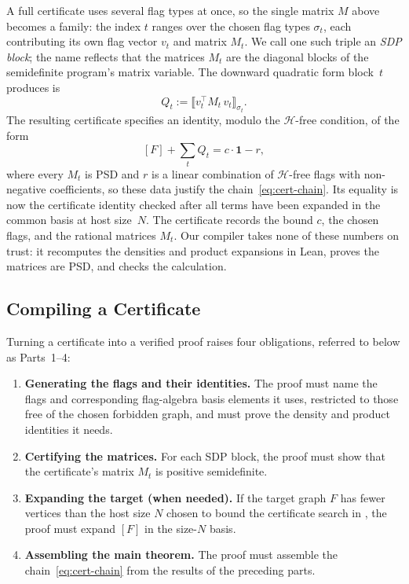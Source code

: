 \documentclass[acmsmall,screen=true,acmthm=false]{acmart}
\begin{document}
A full certificate uses several flag types at once, so the single matrix $M$
above becomes a family: the index $t$ ranges over the chosen flag types
$\sigma_t$, each contributing its own flag vector $v_t$ and matrix $M_t$.  We
call one such triple an \emph{SDP block};
the name reflects that the matrices $M_t$ are the diagonal blocks of the
semidefinite program's matrix variable.  The downward quadratic form
block~$t$ produces is
\[
  Q_t := \bigl\llbracket
    v_t^\top M_t\, v_t
  \bigr\rrbracket_{\sigma_t}.
\]
The resulting certificate specifies an identity, modulo the $\mathcal H$-free
condition, of the form
\[
  [F] + \sum_t Q_t
  =
  c\cdot\mathbf{1} - r,
\]
where every $M_t$ is PSD and $r$ is a linear combination of $\mathcal H$-free
flags with non-negative coefficients, so these data justify the
chain~\eqref{eq:cert-chain}.  Its equality is now the certificate identity
checked after all terms have been expanded in the common basis at host
size~$N$.  The certificate records the bound $c$, the chosen
flags, and the rational matrices $M_t$.  Our compiler takes none of these
numbers on trust: it recomputes the
densities and product expansions in Lean, proves the
matrices are PSD, and checks the calculation.

\subsection{Compiling a Certificate}
\label{sec:flagmatic-shape}
\label{sec:flagmatic-pipeline}
\label{sec:flagmatic-gen}\label{sec:flagmatic-psd}\label{sec:flagmatic-expand}%
\label{sec:flagmatic-close}\label{sec:flagmatic-script}%

Turning a certificate into a verified proof raises four obligations, referred
to below as Parts~1--4:

\begin{enumerate}
  \item \textbf{Generating the flags and their identities.}  The proof must name
    the flags and corresponding flag-algebra basis elements it uses,
    restricted to those free of the chosen forbidden graph, and must prove the
    density and product identities it needs.
  \item \textbf{Certifying the matrices.}  For each SDP block, the proof must
    show that the certificate's matrix $M_t$ is positive semidefinite.
  \item \textbf{Expanding the target (when needed).}  If the target graph $F$
    has fewer vertices than the host size $N$ chosen to bound the certificate
    search in , the proof must expand $[F]$ in
    the size-$N$ basis.
  \item \textbf{Assembling the main theorem.}  The proof must assemble the
    chain~\eqref{eq:cert-chain} from the results of the preceding parts.
\end{enumerate}
\end{document}
